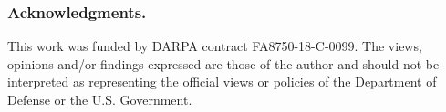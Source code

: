\documentclass[conference]{IEEEtran}
\begin{document}




















\subsubsection*{Acknowledgments.}
This work was funded by DARPA contract  FA8750-18-C-0099. The views, opinions and/or
findings expressed are those of the author and should not be interpreted as representing
the official views or policies of the Department of Defense or the U.S. Government.



\end{document}

